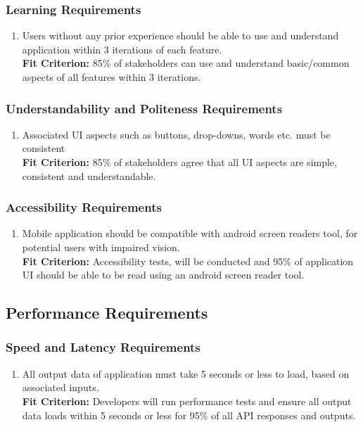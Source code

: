 \documentclass[12pt,letterpaper]{article}
\begin{document}
\subsubsection{Learning Requirements}
\begin{enumerate}[resume*] 
    \item Users without any prior experience should be able to use and understand application within 3 iterations of each feature.\\
    {\textbf{Fit Criterion:} 85\% of stakeholders can use and understand basic/common aspects of all features within 3 iterations.}
\end{enumerate}

\subsubsection{Understandability and Politeness Requirements}
\begin{enumerate}[resume*] 
    \item Associated UI aspects such as buttons, drop-downs, words etc. must be consistent\\
    {\textbf{Fit Criterion:} 85\% of stakeholders agree that all UI aspects are simple, consistent and understandable.}
\end{enumerate}

\subsubsection{Accessibility Requirements}
\begin{enumerate}[resume*] 
    \item Mobile application should be compatible with android screen readers tool, for potential users with impaired vision.\\
    {\textbf{Fit Criterion:} Accessibility tests, will be conducted and 95\% of application UI should be able to be read using an android screen reader tool.}
\end{enumerate}

\subsection{Performance Requirements}
\subsubsection{Speed and Latency Requirements}
\begin{enumerate}[{PE}1.] 
    \item All output data of application must take 5 seconds or less to load, based on associated inputs.\\
    {\textbf{Fit Criterion:} Developers will run performance tests and ensure all output data loads within 5 seconds or less for 95\% of all API responses and outputs.}
\end{enumerate}
\end{document}
